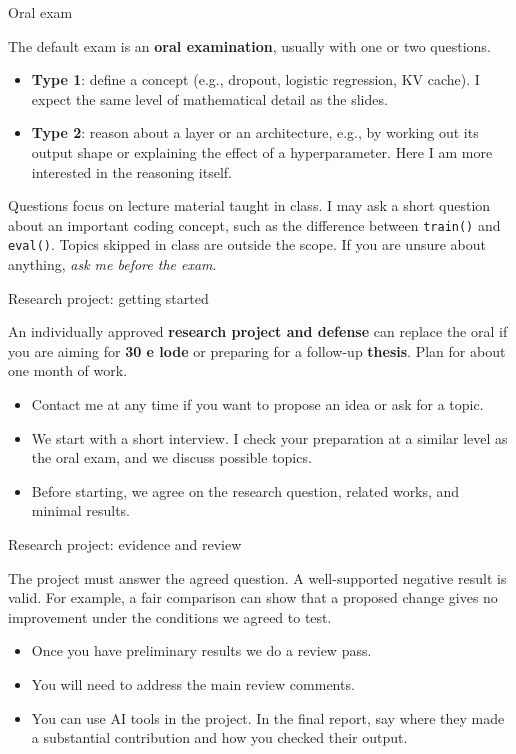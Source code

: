 \documentclass[14pt,aspectratio=169,notheorems]{beamer}
\begin{document}
\begin{frame}{Oral exam}
	\small

	The default exam is an \textbf{oral examination}, usually with one or two questions.

	\begin{itemize}
		\item \textbf{Type 1}: define a concept (e.g., dropout, logistic regression, KV cache). I expect the same level of mathematical detail as the slides.
		\item \textbf{Type 2}: reason about a layer or an architecture, e.g., by working out its output shape or explaining the effect of a hyperparameter. Here I am more interested in the reasoning itself.
	\end{itemize}

	Questions focus on lecture material taught in class. I may ask a short question about an important coding concept, such as the difference between \texttt{train()} and \texttt{eval()}. Topics skipped in class are outside the scope. If you are unsure about anything, \textit{ask me before the exam}.

\end{frame}

\begin{frame}{Research project: getting started}
	\small

	An individually approved \textbf{research project and defense} can replace the oral if you are aiming for \textbf{30 e lode} or preparing for a follow-up \textbf{thesis}. Plan for about one month of work.

	\begin{itemize}
		\item Contact me at any time if you want to propose an idea or ask for a topic.
		\item We start with a short interview. I check your preparation at a similar level as the oral exam, and we discuss possible topics.
		\item Before starting, we agree on the research question, related works, and minimal results.
	\end{itemize}

\end{frame}

\begin{frame}{Research project: evidence and review}
	\small

	The project must answer the agreed question. A well-supported negative result is valid. For example, a fair comparison can show that a proposed change gives no improvement under the conditions we agreed to test.

	\begin{itemize}
		\item Once you have preliminary results we do a review pass.
		\item You will need to address the main review comments. 
		\item You can use AI tools in the project. In the final report, say where they made a substantial contribution and how you checked their output.
	\end{itemize}

\end{frame}
\end{document}
